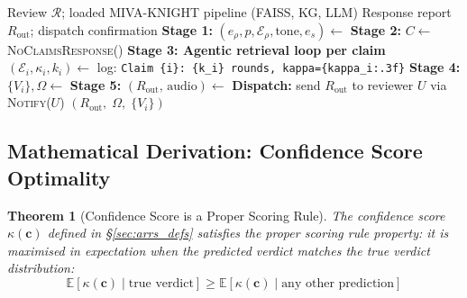 \documentclass[12pt,a4paper]{article}
\theoremstyle{definition}
\theoremstyle{plain}
\newtheorem{theorem}{Theorem}[section]
\theoremstyle{remark}
\newcommand{\EE}{\mathbb{E}}
\begin{document}
\begin{algorithm}[H]
\caption{ARRS --- Full Agentic Review Response (End-to-End)}
\label{alg:arrs_full}
\begin{algorithmic}[1]
\Require Review $\mathcal{R}$; loaded MIVA-KNIGHT pipeline (FAISS, KG, LLM)
\Ensure Response report $R_{\text{out}}$; dispatch confirmation
\State \textbf{Stage 1:} $(e_\rho, p, \mathcal{E}_\rho, \text{tone}, e_s)
       \gets$ 
\State \textbf{Stage 2:} $C \gets$ 
  \State \Return \textsc{NoClaimsResponse}()
\EndIf
\State \textbf{Stage 3: Agentic retrieval loop per claim}
  \State $(\mathcal{E}_i, \kappa_i, k_i) \gets$ 
  \State log: \texttt{Claim \{i\}: \{k\_i\} rounds, kappa=\{kappa\_i:.3f\}}
\EndFor
\State \textbf{Stage 4:} $\{V_i\}, \Omega \gets$ 
\State \textbf{Stage 5:} $(R_{\text{out}},\, \text{audio}) \gets$
\State \textbf{Dispatch:} send $R_{\text{out}}$ to reviewer $U$ via \textsc{Notify}($U$)
\State \Return $(R_{\text{out}},\; \Omega,\; \{V_i\})$
\end{algorithmic}
\end{algorithm}

\subsection{Mathematical Derivation: Confidence Score Optimality}
\label{sec:arrs_confidence_math}

\begin{theorem}[Confidence Score is a Proper Scoring Rule]
\label{thm:proper_scoring}
The confidence score $\kappa(\mathbf{c})$ defined in 
\S\ref{sec:arrs_defs} satisfies the proper scoring rule property: 
it is maximised in expectation when the predicted verdict matches the 
true verdict distribution:
\[
  \EE[\kappa(\mathbf{c}) \mid \text{true verdict}] \ge 
  \EE[\kappa(\mathbf{c}) \mid \text{any other prediction}]
\]
\end{theorem}
\end{document}
